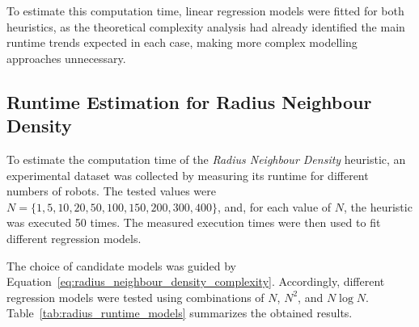 To estimate this computation time, linear regression models were fitted for both heuristics, as the
theoretical complexity analysis had already identified the main runtime trends expected in each case,
making more complex modelling approaches unnecessary.


\subsection{Runtime Estimation for Radius Neighbour Density}
\label{subsec:radius_runtime_estimation}
\hspace{\parindent}
To estimate the computation time of the \textit{Radius Neighbour Density} heuristic, an experimental
dataset was collected by measuring its runtime for different numbers of robots. The tested values
were \(N=\{1,5,10,20,50,100,150,200,300,400\}\), and, for each value of \(N\), the heuristic was
executed 50 times. The measured execution times were then used to fit different regression models.

The choice of candidate models was guided by Equation~\ref{eq:radius_neighbour_density_complexity}.
Accordingly, different regression models were tested using combinations of \(N\), \(N^2\), and
\(N\log N\). Table~\ref{tab:radius_runtime_models} summarizes the obtained results.

\begin{table}[H]
\centering
\caption{Regression models tested for estimating the computation time of the \textit{Radius Neighbour Density} heuristic.}
\label{tab:radius_runtime_models}
\small
{}
\end{table}

